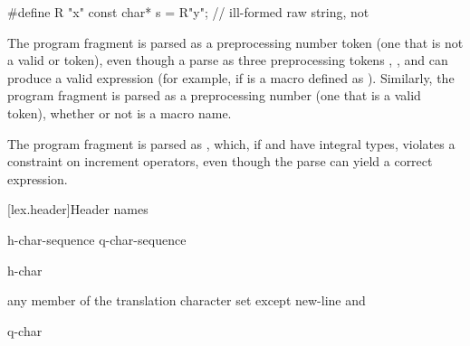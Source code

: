 \pnum
\begin{example}
\begin{codeblock}
#define R "x"
const char* s = R"y";           // ill-formed raw string, not 
\end{codeblock}
\end{example}

\pnum
\begin{example}
The program fragment  is parsed as a
preprocessing number token (one that is not a valid
 or  token),
even though a parse as three preprocessing tokens
, \tcode{+}, and  can produce a valid expression (for example,
if  is a macro defined as ). Similarly, the
program fragment  is parsed as a preprocessing number (one
that is a valid  token),
whether or not  is a macro name.
\end{example}

\pnum
\begin{example}
The program fragment  is parsed as , which, if  and  have integral types,
violates a constraint on increment operators, even though the parse
 can yield a correct expression.
\end{example}

[lex.header]{Header names}

%
\begin{bnf}
\br
    \terminal{<} h-char-sequence \terminal{>}\br
     q-char-sequence 
\end{bnf}

\begin{bnf}
\br
    h-char 
\end{bnf}

\begin{bnf}
\br
    \textnormal{any member of the translation character set except new-line and }
\end{bnf}

\begin{bnf}
\br
    q-char 
\end{bnf}

